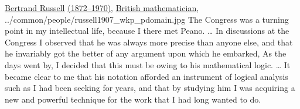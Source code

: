 \qboxnpq
  { \href{http://en.wikipedia.org/wiki/Bertrand_Russell}{Bertrand Russell}
    \href{http://www-history.mcs.st-andrews.ac.uk/Timelines/TimelineF.html}{(1872--1970)},
    \href{http://www-history.mcs.st-andrews.ac.uk/BirthplaceMaps/Places/UK.html}{British mathematician},
    \footnotemark
  }
  {../common/people/russell1907_wkp_pdomain.jpg} %
  {The Congress was a turning point in my intellectual life, 
  because I there met Peano.%
  \ldots
  In discussions at the Congress I observed that he was always 
  more precise than anyone else, and that he invariably got the better 
  of any argument upon which he embarked,
  As the days went by, I decided that this must be owing to his 
  mathematical logic.%
  \ldots
  It became clear to me that his notation afforded an instrument 
  of logical analysis such as I had been seeking for years, 
  and that by studying him I was acquiring a new and powerful 
  technique for the work that I had long wanted to do.}

